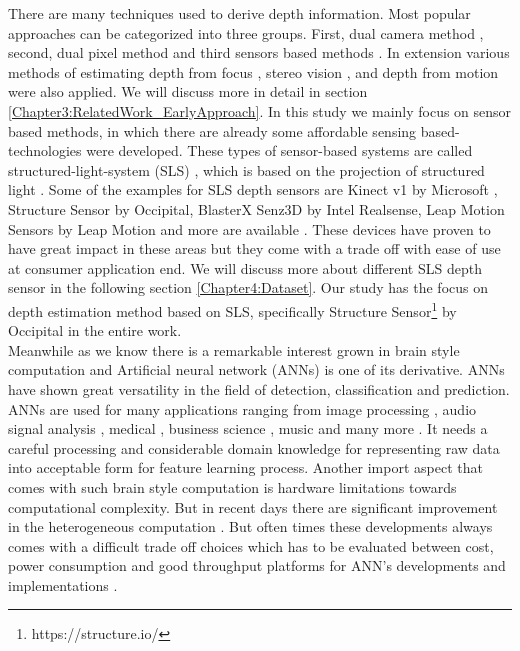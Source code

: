 There are many techniques used to derive depth information. Most popular approaches can be categorized into three groups. First, dual camera method \cite{li2009dual}, second, dual pixel method \cite{martinello2015dual, choi2017all} and third sensors based methods \cite{salvi2004pattern}. In extension various methods of estimating depth from focus \cite{grossmann1987depth}, stereo vision \cite{bulthoff1988integration}, and depth from motion \cite{ullman1979interpretation} were also applied. We will discuss more in detail in section \ref{Chapter3:RelatedWork_EarlyApproach}. In this study we mainly focus on sensor based methods, in which there are already some affordable sensing based-technologies were developed. These types of sensor-based systems are called structured-light-system (SLS) \cite{salvi2004pattern}, which is based on the projection of structured light \cite{zhang2012microsoft}. Some of the examples for SLS depth sensors are Kinect v1 by Microsoft , Structure Sensor by Occipital, BlasterX Senz3D by Intel Realsense, Leap Motion Sensors by Leap Motion \cite{marin2014hand} and more are available \cite{mal2018sparse}. These devices have proven to have great impact in these areas but they come with a trade off with ease of use at consumer application end. We will discuss more about different SLS depth sensor in the following section \ref{Chapter4:Dataset}. Our study has the focus on depth estimation method based on SLS, specifically Structure Sensor\footnote{https://structure.io/} by Occipital in the entire work.\\

Meanwhile as we know there is a remarkable interest grown in brain style computation and Artificial neural network (ANNs) is one of its derivative. ANNs have shown great versatility in the field of detection, classification and prediction. ANNs are used for many applications ranging from image processing \cite{guyon1991applications} , audio signal analysis \cite{bourlard1993continuous}, medical \cite{baxt1990use}, business science \cite{widrow1994neural}, music \cite{nadar2019towards} and many more \cite{zhang2000neural}. It  needs a careful processing and considerable domain knowledge for representing raw data into acceptable form for feature learning process. Another import aspect that comes with such brain style computation is hardware limitations towards computational complexity. But in recent days there are significant improvement in the heterogeneous computation \cite{mittal2015survey}. But often times these developments always comes with a difficult trade off choices which has to be evaluated between cost, power consumption and good throughput platforms for ANN's developments and implementations \cite{mittal2019survey}. \\




